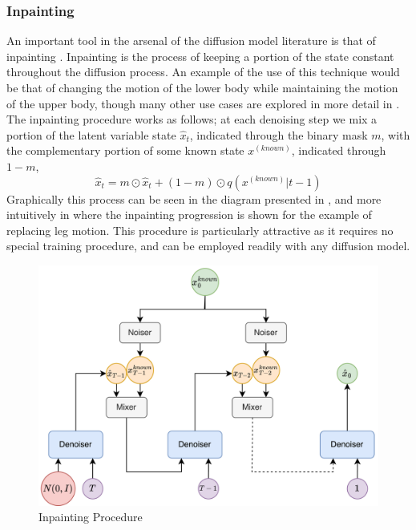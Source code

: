 \subsubsection{Inpainting}
\label{sec:diffusion_method_inpainting}

An important tool in the arsenal of the diffusion model literature is that of inpainting \cite{diffusion_inpainting}. Inpainting is the process of keeping a portion of the state constant throughout the diffusion process. An example of the use of this technique would be that of changing the motion of the lower body while maintaining the motion of the upper body, though many other use cases are explored in more detail in . The inpainting procedure works as follows; at each denoising step we mix a portion of the latent variable state $\hat{x}_t$, indicated through the binary mask $m$, with the complementary portion of some known state $x^{(known)}$, indicated through $1-m$, 
\begin{equation}
    \hat{x}_{t} = m \odot \hat{x}_t + (1-m) \odot q(x^{(known)}|t-1)
\end{equation}
Graphically this process can be seen in the diagram presented in , and more intuitively in  where the inpainting progression is shown for the example of replacing leg motion. This procedure is particularly attractive as it requires no special training procedure, and can be employed readily with any diffusion model.

\begin{figure}[!ht]
    \centering
    \includegraphics[width=1\textwidth]{Figures/diffusion/Inpainting.png}
    \caption{Inpainting Procedure}
    \label{fig:inpainting_diagram}
\end{figure}

